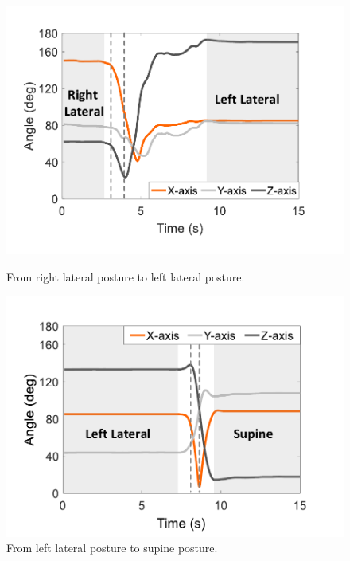 \begin{figure}[!t]
\vspace{-2mm}
\begin{minipage}[t]{0.31\linewidth}\centering
    \includegraphics[width=0.97\linewidth]{Figures/RightToLeft.pdf}
  \caption{From right lateral posture to left lateral posture.}\label{fig:RightToLeft}
\end{minipage}
\hspace{2pt}
\begin{minipage}[t]{0.31\linewidth}\centering
    \includegraphics[width=0.97\linewidth]{Figures/LeftToSupine.pdf}
  \caption{From  left lateral posture to supine posture.}\label{fig:LeftToSupine}
\end{minipage}
\hspace{2pt}
\begin{minipage}[t]{0.31\linewidth}\centering

\end{minipage}
\end{figure}
